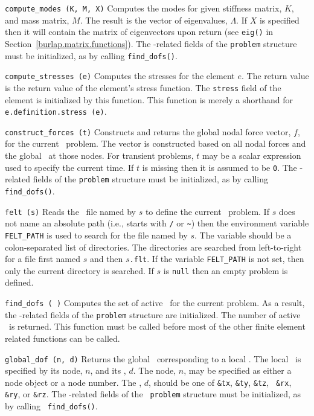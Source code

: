 \begin{dispitems}
\item[\tt compute\_modes (K, M, X)]
Computes the modes for given stiffness matrix, $K$, and mass matrix,
$M$.  The result is the vector of eigenvalues, $\Lambda$.  If $X$ is
specified then it will contain the matrix of eigenvectors upon return
(see {\tt eig()} in Section~\ref{burlap.matrix.functions}).  The
\dof-related fields of the {\tt problem} structure must be
initialized, as by calling {\tt find\_dofs()}.

\item[\tt compute\_stresses (e)]
Computes the stresses for the element $e$.  The return value is the
return value of the element's stress function.  The {\tt stress} field
of the element is initialized by this function.  This function is
merely a shorthand for {\tt e.definition.stress (e)}.

\item[\tt construct\_forces (t)]
Constructs and returns the global nodal force vector, $f$, for the
current \felt\ problem.  The vector is constructed based on all nodal
forces and the global \dofs\ at those nodes.  For transient problems,
$t$ may be a scalar expression used to specify the current time.  If
$t$ is missing then it is assumed to be {\tt 0}.  The \dof-related
fields of the {\tt problem} structure must be initialized, as by
calling {\tt find\_dofs()}.

\item[\tt felt (s)]
Reads the \felt\ file named by $s$ to define the current \felt\
problem.  If $s$ does not name an absolute path (i.e., starts with
{\tt /} or \verb$~$) then the environment variable {\tt FELT\_PATH} is
used to search for the file named by $s$.  The variable should be a
colon-separated list of directories.  The directories are searched
from left-to-right for a file first named $s$ and then $s${\tt .flt}.
If the variable {\tt FELT\_PATH} is not set, then only the current
directory is searched.  If $s$ is {\tt null} then an empty problem is
defined.

\item[\tt find\_dofs ( )]
Computes the set of active \dofs\ for the current problem.  As a
result, the \dof-related fields of the {\tt problem} structure are
initialized.  The number of active \dofs\ is returned.  This function
must be called before most of the other finite element related
functions can be called.

\item[\tt global\_dof (n, d)]
Returns the global \dof\ corresponding to a local \dof.  The local
\dof\ is specified by its node, $n$, and its \dof, $d$.  The node,
$n$, may be specified as either a node object or a node number.  The
\dof, $d$, should be one of {\tt \&tx}, {\tt \&ty}, {\tt \&tz}, {\tt
\&rx}, {\tt \&ry}, or {\tt \&rz}.  The \dof-related fields of the {\tt
problem} structure must be initialized, as by calling {\tt
find\_dofs()}.


\end{dispitems}
